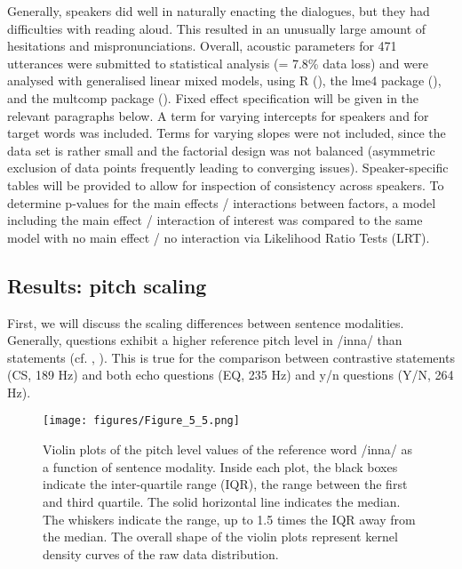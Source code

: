 Generally, speakers did well in naturally enacting the dialogues, but they had difficulties with reading aloud. This resulted in an unusually large amount of hesitations and mispronunciations. Overall, acoustic parameters for 471 utterances were submitted to statistical analysis (= 7.8\% data loss) and were analysed with generalised linear mixed models, using R (\citealt{R}), the lme4 package (\citealt{Bates.etal2014}), and the multcomp package (\citealt{Hothorn.etal2008}). Fixed effect specification will be given in the relevant paragraphs below. A term for varying intercepts for speakers and for target words was included. Terms for varying slopes were not included, since the data set is rather small and the factorial design was not balanced (asymmetric exclusion of data points frequently leading to converging issues). Speaker-specific tables will be provided to allow for inspection of consistency across speakers. To determine p-values for the main effects / interactions between factors, a model including the main effect / interaction of interest was compared to the same model with no main effect / no interaction via Likelihood Ratio Tests (LRT). 

\subsection{Results: pitch scaling}
First, we will discuss the scaling differences between sentence modalities. Generally, questions exhibit a higher reference pitch level in /inna/ than statements (cf. , ). This is true for the comparison between contrastive statements (CS, 189 Hz) and both echo questions (EQ, 235 Hz) and y/n questions (Y/N, 264 Hz).

  \begin{figure}
  \centering 
   \texttt{[image: figures/Figure\_5\_5.png]}
  \caption{Violin plots of the pitch level values of the reference word /inna/ as a function of sentence modality. Inside each plot, the black boxes indicate the inter-quartile range (IQR), the range between the first and third quartile. The solid horizontal line indicates the median. The whiskers indicate the range, up to 1.5 times the IQR away from the median. The overall shape of the violin plots represent kernel density curves of the raw data distribution.}
   \label{fig:5.5}
   \end{figure}

